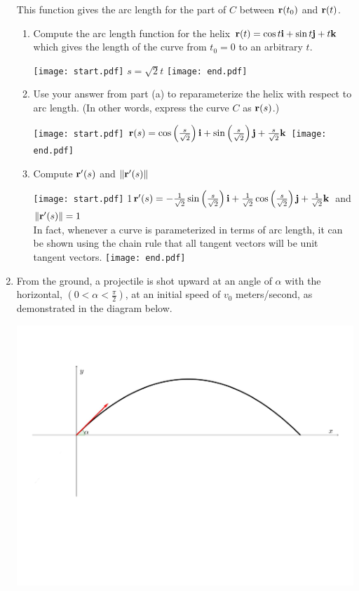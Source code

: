 \documentclass[12pt]{article}
\begin{document}
\begin{enumerate}
This function gives the arc length for the part of $C$ between ${\bf r}(t_0)$ and ${\bf r}(t)$.

\begin{enumerate}

\item Compute the arc length function for the helix ${\bf r}(t)=\cos{t} {\bf i}+\sin{t} {\bf j}+t {\bf k}$ which gives the length of the curve from $t_0=0$ to an arbitrary $t$.

\texttt{[image: start.pdf]}
{{$s=\sqrt{2}t$}}
\texttt{[image: end.pdf]}


\item Use your answer from part (a) to reparameterize the helix with respect to arc length. (In other words, express the curve $C$ as ${\bf r}(s)$.)

\texttt{[image: start.pdf]}
{{${\bf r}(s)=\cos\left(\frac{s}{\sqrt{2}}\right){\bf i}+\sin\left(\frac{s}{\sqrt{2}}\right){\bf j}+\frac{s}{\sqrt{2}}{\bf k}$}}
\texttt{[image: end.pdf]}


\item Compute ${\bf r}^{\prime}(s)$ and $\|{\bf r}^{\prime}(s)\|$

\texttt{[image: start.pdf]}
{{{1\linewidth}{${\bf r}^{\prime}(s)=-\frac{1}{\sqrt{2}}\sin\left(\frac{s}{\sqrt{2}}\right){\bf i}+\frac{1}{\sqrt{2}}\cos\left(\frac{s}{\sqrt{2}}\right){\bf j}+\frac{1}{\sqrt{2}}{\bf k}$ and $\|{\bf r}^{\prime}(s)\|=1$\\
In fact, whenever a curve is parameterized in terms of arc length, it can be shown using the chain rule that all tangent vectors will be unit tangent vectors.
}}}
\texttt{[image: end.pdf]}


\end{enumerate}

\newpage

\item From the ground, a projectile is shot upward at an angle of $\alpha$ with the horizontal, $\left(0<\alpha<\frac{\pi}{2}\right)$, at an initial speed of $v_0$ meters/second, as demonstrated in the diagram below.

\begin{center}
\includegraphics[scale=0.5]{projectile.pdf}
\end{center}


\end{enumerate}
\end{document}
